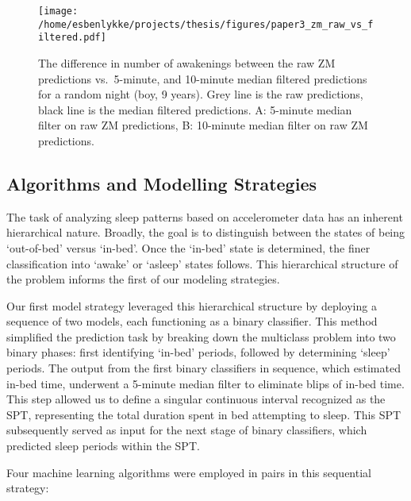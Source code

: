 \documentclass[
  10pt,
]{scrbook}
\begin{document}
\begin{figure}

{\centering \texttt{[image: /home/esbenlykke/projects/thesis/figures/paper3\_zm\_raw\_vs\_filtered.pdf]}

}

\caption{\label{fig-paper3_raw_filt}The difference in number of
awakenings between the raw ZM predictions vs.~5-minute, and 10-minute
median filtered predictions for a random night (boy, 9 years). Grey line
is the raw predictions, black line is the median filtered predictions.
A: 5-minute median filter on raw ZM predictions, B: 10-minute median
filter on raw ZM predictions.}

\end{figure}

\hypertarget{algorithms-and-modelling-strategies}{%
\subsection{Algorithms and Modelling
Strategies}\label{algorithms-and-modelling-strategies}}

The task of analyzing sleep patterns based on accelerometer data has an
inherent hierarchical nature. Broadly, the goal is to distinguish
between the states of being `out-of-bed' versus `in-bed'. Once the
`in-bed' state is determined, the finer classification into `awake' or
`asleep' states follows. This hierarchical structure of the problem
informs the first of our modeling strategies.

Our first model strategy leveraged this hierarchical structure by
deploying a sequence of two models, each functioning as a binary
classifier. This method simplified the prediction task by breaking down
the multiclass problem into two binary phases: first identifying
`in-bed' periods, followed by determining `sleep' periods. The output
from the first binary classifiers in sequence, which estimated in-bed
time, underwent a 5-minute median filter to eliminate blips of in-bed
time. This step allowed us to define a singular continuous interval
recognized as the SPT, representing the total duration spent in bed
attempting to sleep. This SPT subsequently served as input for the next
stage of binary classifiers, which predicted sleep periods within the
SPT.

Four machine learning algorithms were employed in pairs in this
sequential strategy:
\end{document}
